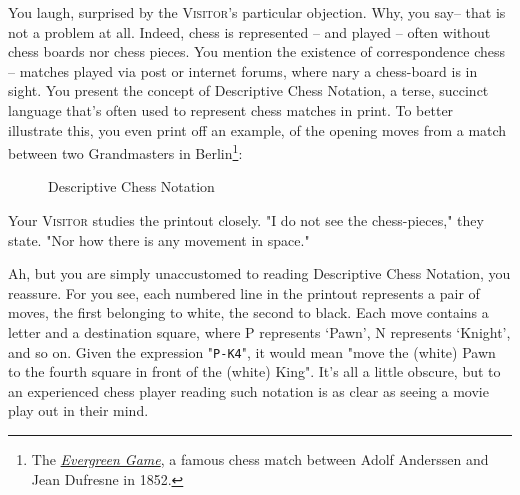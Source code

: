 You laugh, surprised by the \textsc{Visitor}'s particular objection. Why, you say-- that is not a problem at all. Indeed, chess is represented -- and played -- often without chess boards nor chess pieces. You mention the existence of correspondence chess -- matches played via post or internet forums, where nary a chess-board is in sight. You present the concept of Descriptive Chess Notation, a terse, succinct language that's often used to represent chess matches in print. To better illustrate this, you even print off an example, of the opening moves from a match between two Grandmasters in Berlin\footnote{The \href{https://en.wikipedia.org/wiki/Evergreen_Game}{\emph{Evergreen Game}}, a famous chess match between Adolf Anderssen and Jean Dufresne in 1852.}:

\begin{figure}[H]
  \begin{center}
  \end{center}
  \caption{Descriptive Chess Notation}
  \label{fig:DCN}
\end{figure}

\noindent
Your \textsc{Visitor} studies the printout closely. "I do not see the chess-pieces," they state. "Nor how there is any movement in space."

Ah, but you are simply unaccustomed to reading Descriptive Chess Notation, you reassure. For you see, each numbered line in the printout represents a pair of moves, the first belonging to white, the second to black. Each move contains a letter and a destination square, where P represents `Pawn', N represents `Knight', and so on. Given the expression "\texttt{P-K4}", it would mean "move the (white) Pawn to the fourth square in front of the (white) King". It's all a little obscure, but to an experienced chess player reading such notation is as clear as seeing a movie play out in their mind.


